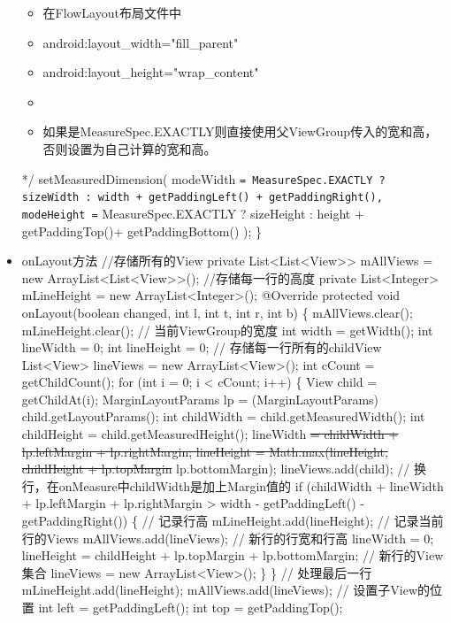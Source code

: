 \documentclass[9pt, b5paper]{article}
\begin{document}
\begin{itemize}
\begin{itemize}
\item 在FlowLayout布局文件中
\item android:layout\_width="fill\_parent"
\item android:layout\_height="wrap\_content"
\item 
\item 如果是MeasureSpec.EXACTLY则直接使用父ViewGroup传入的宽和高，否则设置为自己计算的宽和高。
\end{itemize}
     */
    setMeasuredDimension(
            modeWidth \texttt{= MeasureSpec.EXACTLY ? sizeWidth : width + getPaddingLeft() + getPaddingRight(),
                modeHeight =} MeasureSpec.EXACTLY ? sizeHeight : height + getPaddingTop()+ getPaddingBottom()
    );
\}
\item onLayout方法
//存储所有的View
   private List<List<View>> mAllViews = new ArrayList<List<View>>();
   //存储每一行的高度
   private List<Integer> mLineHeight = new ArrayList<Integer>();
   @Override
   protected void onLayout(boolean changed, int l, int t, int r, int b)
   \{
       mAllViews.clear();
       mLineHeight.clear();
       // 当前ViewGroup的宽度
       int width = getWidth();
       int lineWidth = 0;
       int lineHeight = 0;
       // 存储每一行所有的childView
       List<View> lineViews = new ArrayList<View>();
       int cCount = getChildCount();
       for (int i = 0; i < cCount; i++)
       \{
           View child = getChildAt(i);
           MarginLayoutParams lp = (MarginLayoutParams) child.getLayoutParams();
           int childWidth = child.getMeasuredWidth();
           int childHeight = child.getMeasuredHeight();
           lineWidth \sout{= childWidth + lp.leftMargin + lp.rightMargin;
           lineHeight = Math.max(lineHeight, childHeight + lp.topMargin} lp.bottomMargin);
           lineViews.add(child);
           // 换行，在onMeasure中childWidth是加上Margin值的
           if (childWidth + lineWidth + lp.leftMargin + lp.rightMargin > width - getPaddingLeft() - getPaddingRight())
           \{
               // 记录行高
               mLineHeight.add(lineHeight);
               // 记录当前行的Views
               mAllViews.add(lineViews);
               // 新行的行宽和行高
               lineWidth = 0;
               lineHeight = childHeight + lp.topMargin + lp.bottomMargin;
               // 新行的View集合
               lineViews = new ArrayList<View>();
           \}
       \}
       // 处理最后一行
       mLineHeight.add(lineHeight);
       mAllViews.add(lineViews);
       // 设置子View的位置
       int left = getPaddingLeft();
       int top = getPaddingTop();

\end{itemize}
\end{document}
